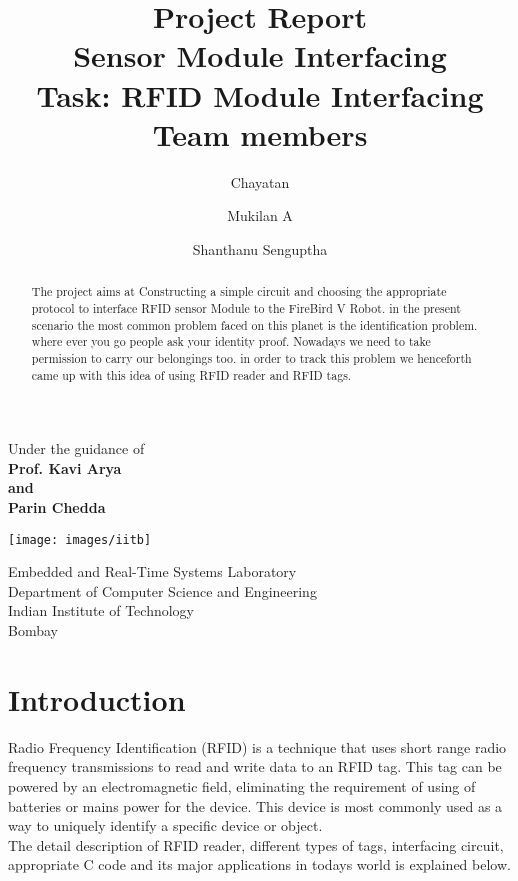 \documentclass[a4paper,11pt]{article}
\title {Project Report \\ Sensor Module Interfacing \\[10pt] Task: RFID Module Interfacing \\[25pt] Team members }
\author {Chayatan \and Mukilan A \and Shanthanu Senguptha}
\begin{document}
\maketitle
\begin{center}
\begin{large}
Under the guidance of\\
\textbf{Prof. Kavi Arya\\and\\Parin Chedda}\\
\end{large}
\end{center}
\begin{center}
\texttt{[image: images/iitb]}
\end{center}
\begin{center}
\begin{large}
Embedded and Real-Time Systems Laboratory \\
Department of Computer Science and Engineering \\
Indian Institute of Technology \\
Bombay \\
\end{large}
\end{center}

\newpage
\tableofcontents
\newpage

\begin{abstract}
The project aims at Constructing a simple circuit and choosing the appropriate protocol to interface RFID sensor Module to the FireBird V Robot. in the present scenario the most common problem faced on this planet is the identification problem. where ever you go people ask your identity proof. Nowadays we need to take permission to carry our belongings too. in order to track this problem we henceforth came up with this idea of using RFID reader and RFID tags. 
\end{abstract}

\section{Introduction}
\begin{Large}
Radio Frequency Identification (RFID) is a technique that uses short range radio frequency transmissions to read and write data to an RFID tag. This tag can be powered by an electromagnetic field, eliminating the requirement of using of batteries or mains power for the device. This device is most commonly used as a way to uniquely identify a specific device or object.
\\
The detail description of RFID reader, different types of tags, interfacing circuit, appropriate C code and its major applications in todays world is explained below.
\end{Large}
\end{document}

